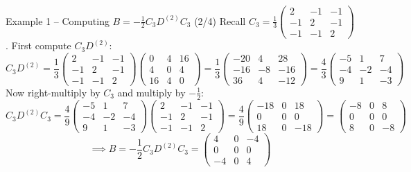 \documentclass[aspectratio=169]{beamer}\usepackage[]{graphicx}\usepackage[]{xcolor}
\begin{document}
\begin{frame}{Example 1 -- Computing $B = -\frac{1}{2}C_3 D^{(2)} C_3$ (2/4)}
Recall $C_3 = \frac{1}{3}\begin{pmatrix} 2 & -1 & -1 \\ -1 & 2 & -1 \\ -1 & -1 & 2 \end{pmatrix}$. First compute $C_3 D^{(2)}$:
\[
C_3 D^{(2)} = \frac{1}{3}\begin{pmatrix}
2 & -1 & -1 \\
-1 & 2 & -1 \\
-1 & -1 & 2
\end{pmatrix}
\begin{pmatrix}
0 & 4 & 16 \\
4 & 0 & 4 \\
16 & 4 & 0
\end{pmatrix}
= \frac{1}{3}\begin{pmatrix}
-20 & 4 & 28 \\
-16 & -8 & -16 \\
36 & 4 & -12
\end{pmatrix}
= \frac{4}{3}\begin{pmatrix}
-5 & 1 & 7 \\
-4 & -2 & -4 \\
9 & 1 & -3
\end{pmatrix}
\]
\vfill
Now right-multiply by $C_3$ and multiply by $-\frac{1}{2}$:
\[
C_3 D^{(2)} C_3 = \frac{4}{9}\begin{pmatrix}
-5 & 1 & 7 \\
-4 & -2 & -4 \\
9 & 1 & -3
\end{pmatrix}
\begin{pmatrix}
2 & -1 & -1 \\
-1 & 2 & -1 \\
-1 & -1 & 2
\end{pmatrix}
= \frac{4}{9}\begin{pmatrix}
-18 & 0 & 18 \\
0 & 0 & 0 \\
18 & 0 & -18
\end{pmatrix}
= \begin{pmatrix}
-8 & 0 & 8 \\
0 & 0 & 0 \\
8 & 0 & -8
\end{pmatrix}
\]
\[
\implies B = -\frac{1}{2}C_3 D^{(2)} C_3 = \begin{pmatrix}
4 & 0 & -4 \\
0 & 0 & 0 \\
-4 & 0 & 4
\end{pmatrix}
\]
\end{frame}
\end{document}
